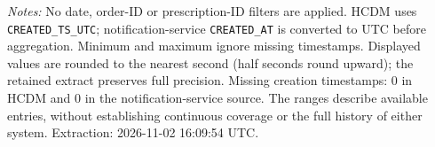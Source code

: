 \noindent\textit{Notes:} No date, order-ID or prescription-ID filters are applied. HCDM uses \texttt{CREATED\_TS\_UTC}; notification-service \texttt{CREATED\_AT} is converted to UTC before aggregation. Minimum and maximum ignore missing timestamps. Displayed values are rounded to the nearest second (half seconds round upward); the retained extract preserves full precision. Missing creation timestamps: 0 in HCDM and 0 in the notification-service source. The ranges describe available entries, without establishing continuous coverage or the full history of either system. Extraction: 2026-11-02 16:09:54 UTC.



\clearpage

